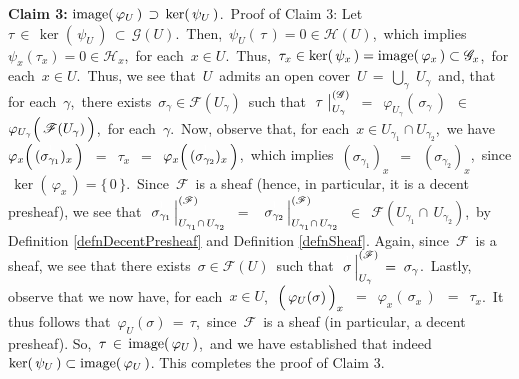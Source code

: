 \vskip 0.5cm
\noindent
\textbf{Claim 3:}\; $\textnormal{image}\!\left(\,\varphi_{U}\,\right) \,\supset\, \ker\!\left(\,\psi_{U}\,\right)$.\,
\vskip 0.2cm
\noindent
Proof of Claim 3:\;
Let \,$\tau \,\in\, \ker(\,\psi_{U}\,) \,\subset\, \mathscr{G}(U)$.\,
Then,
\,$\psi_{U}(\,\tau\,) = 0 \in \mathscr{H}(U)$,\,
which implies
\,$\psi_{x}(\tau_{x}) = 0 \in\mathscr{H}_{x}$,\, for each \,$x \in U$.\,
Thus,
\,$\tau_{x} \in \ker(\,\psi_{x}\,) = \textnormal{image}(\,\varphi_{x}\,) \subset \mathscr{G}_{x}$,\, for each \,$x \in U$.\,
Thus, we see that \,$U$\, admits an open cover \,$U \,=\, \underset{\gamma}{\bigcup}\;U_{\gamma}$\,
and, that for each \,$\gamma$,\, there exists
\,$\sigma_{\gamma} \in \mathscr{F}(U_{\gamma})$\,
such that
\,$\left.\overset{{\color{white}.}}{\tau}\;\right\vert^{(\mathscr{G})}_{U_{\gamma}}$
\,$=$\, $\varphi_{U_{\gamma}}(\,\sigma_{\gamma}\,)$
\,$\in$\, $\varphi_{U_{\gamma}}\!\left(\,\overset{{\color{white}.}}{\mathscr{F}(U_{\gamma})}\,\right)$,\,
for each \,$\gamma$.\,
Now, observe that, for each
\,$x \in U_{\gamma_{1}}\cap U_{\gamma_{2}}$,\,
we have
\,$\varphi_{x}\!\left(\,(\overset{{\color{white}1}}{\sigma_{\gamma_{1}}})_{x}\,\right)$
\,$=$\, $\tau_{x}$
\,$=$\, $\varphi_{x}\!\left(\,(\overset{{\color{white}1}}{\sigma_{\gamma_{2}}})_{x}\,\right)$,\,
which implies
\,$(\sigma_{\gamma_{1}})_{x}$ \,$=$\, $(\sigma_{\gamma_{2}})_{x}$,\,
since \,$\ker(\,\varphi_{x}\,) = \{\,0\,\}$.\,
{\color{red}Since \,$\mathscr{F}$\, is a sheaf} (hence, in particular, it is a decent presheaf),
we see that
\,$\left.\overset{{\color{white}1}}{\sigma_{\gamma_{1}}}\,\right\vert^{(\mathscr{F})}_{U_{\gamma_{1}}\cap\,U_{\gamma_{2}}}$
\,$=$\,
\,$\left.\overset{{\color{white}1}}{\sigma_{\gamma_{2}}}\,\right\vert^{(\mathscr{F})}_{U_{\gamma_{1}}\cap\,U_{\gamma_{2}}}$
\,$\in$\, $\mathscr{F}(U_{\gamma_{1}}\cap\,U_{\gamma_{2}})$,\,
by Definition \ref{defnDecentPresheaf} and Definition \ref{defnSheaf}.
Again, {\color{red}since \,$\mathscr{F}$\, is a sheaf}, we see that there exists \,$\sigma \in \mathscr{F}(U)$\,
such that
\,$\left.\overset{{\color{white}1}}{\sigma}\,\right\vert^{(\mathscr{F})}_{U_{\gamma}} \,=\; \sigma_{\gamma}$.\,
Lastly, observe that we now have, for each \,$x \in U$,\,
\,$\left(\,\overset{{\color{white}.}}{\varphi_{U}(\sigma)}\,\right)_{x}$
\,$=$\, $\varphi_{x}(\,\sigma_{x}\,)$
\,$=$\, $\tau_{x}$.\,
It thus follows that
\,$\varphi_{U}(\sigma) \,=\, \tau$,\,
{\color{red}since \,$\mathscr{F}$\, is a sheaf} (in particular, a decent presheaf).
So, \,$\tau \,\in\, \textnormal{image}(\,\varphi_{U}\,)$,\,
and we have established that indeed
\,$\ker(\,\psi_{U}\,) \subset \textnormal{image}(\,\varphi_{U}\,)$.
\vskip 0.2cm
\noindent
This completes the proof of Claim 3.

